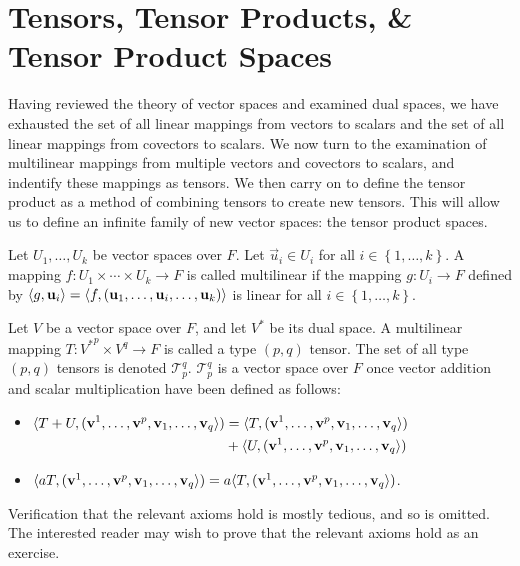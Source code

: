 \documentclass[../main.tex]{subfiles}
\begin{document}
    \section{Tensors, Tensor Products, \& Tensor Product Spaces}
    Having reviewed the theory of vector spaces and examined dual spaces, we have exhausted the set of all linear mappings from vectors to scalars and the set of all linear mappings from covectors to scalars. We now turn to the examination of multilinear mappings from multiple vectors and covectors to scalars, and indentify these mappings as tensors. We then carry on to define the tensor product as a method of combining tensors to create new tensors. This will allow us to define an infinite family of new vector spaces: the tensor product spaces.
    \begin{definition}
        Let \(U_{1},\dots,U_{k}\) be vector spaces over \(F\). Let \(\vec{u}_{i}\in{}U_{i}\) for all \(i\in\left\{1,\dots,k\right\}\). A mapping \(f:U_{1}\times\cdots\times{}U_{k}\to{}F\) is called multilinear if the mapping \(g:U_{i}\to{}F\) defined by \(\langle g,\mathbf{u}_{i}\rangle=\langle f,(\mathbf{u}_{1},\dots,\mathbf{u}_{i},\dots,\mathbf{u}_{k})\rangle\) is linear for all \(i\in\left\{1,\dots,k\right\}\).
    \end{definition}
    \begin{definition}[Tensors]
        Let \(V\) be a vector space over \(F\), and let \(V^{*}\) be its dual space. A multilinear mapping \(T:{V^{*}}^{p}\times{}V^{q}\to{}F\) is called a type \((p,q)\) tensor. The set of all type \((p,q)\) tensors is denoted \(\mathcal{T}_{p}^{q}\). \(\mathcal{T}_{p}^{q}\) is a vector space over \(F\) once vector addition and scalar multiplication have been defined as follows:
        \begin{itemize}
            \item\(\begin{aligned}[t]
                    \langle T+U,(\mathbf{v}^{1},\dots,\mathbf{v}^{p},\mathbf{v}_{1},\dots,\mathbf{v}_{q}\rangle)&=\langle T,(\mathbf{v}^{1},\dots,\mathbf{v}^{p},\mathbf{v}_{1},\dots,\mathbf{v}_{q}\rangle)\\
                                                                                            &+\langle U,(\mathbf{v}^{1},\dots,\mathbf{v}^{p},\mathbf{v}_{1},\dots,\mathbf{v}_{q}\rangle)
            \end{aligned}\)
            \item\(\langle aT,(\mathbf{v}^{1},\dots,\mathbf{v}^{p},\mathbf{v}_{1},\dots,\mathbf{v}_{q}\rangle)=a\langle T,(\mathbf{v}^{1},\dots,\mathbf{v}^{p},\mathbf{v}_{1},\dots,\mathbf{v}_{q}\rangle)\).
        \end{itemize}
        Verification that the relevant axioms hold is mostly tedious, and so is omitted. The interested reader may wish to prove that the relevant axioms hold as an exercise.
    \end{definition}
\end{document}
